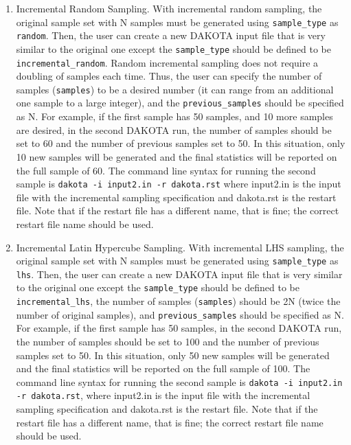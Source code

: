 \begin{enumerate}

\item Incremental Random Sampling.  With incremental random sampling, 
the original sample set with N samples must be 
generated using \texttt{sample\_type} as \texttt{random}.
Then, the user can create a new DAKOTA input file that is very similar to the 
original one except the \texttt{sample\_type} should be defined to be 
\texttt{incremental\_random}.  Random incremental sampling does not 
require a doubling of samples each time.  Thus, the user 
can specify the number of samples (\texttt{samples}) to be a desired 
number (it can range from an additional one sample to a large integer), 
and the \texttt{previous\_samples} should be specified as N.  For example, if
the first sample has 50 samples, and 10 more samples are desired, 
in the second DAKOTA run, the number
of samples should be set to 60 and the number of previous samples set
to 50.  In this situation, only 10 new samples will be generated and
the final statistics will be reported on the full sample of 60. The
command line syntax for running the second sample is \texttt{dakota -i
input2.in -r dakota.rst} where input2.in is the input file with the
incremental sampling specification and dakota.rst is the restart file.
Note that if the restart file has a different name, that is fine; the
correct restart file name should be used.

\item Incremental Latin Hypercube Sampling. With incremental LHS sampling, 
the original sample set with N samples must be 
generated using \texttt{sample\_type} as \texttt{lhs}.
Then, the user can create a new DAKOTA input file that is very similar to the 
original one except the \texttt{sample\_type} should be defined to be 
\texttt{incremental\_lhs}, the number of samples (\texttt{samples}) should 
be 2N (twice the number of original samples), and
\texttt{previous\_samples} should be specified as N.  For example, if
the first sample has 50 samples, in the second DAKOTA run, the number
of samples should be set to 100 and the number of previous samples set
to 50.  In this situation, only 50 new samples will be generated and
the final statistics will be reported on the full sample of 100. The
command line syntax for running the second sample is \texttt{dakota -i
input2.in -r dakota.rst}, where input2.in is the input file with the
incremental sampling specification and dakota.rst is the restart file.
Note that if the restart file has a different name, that is fine; the
correct restart file name should be used.

\end{enumerate}


